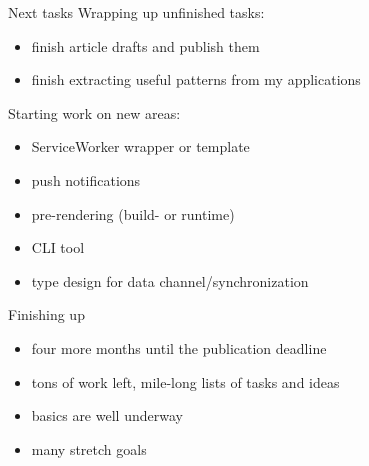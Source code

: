 \documentclass[presentation]{beamer}
\begin{document}
\begin{frame}[label={sec:org31f44b7}]{Next tasks}
Wrapping up unfinished tasks:
\begin{itemize}
\item finish article drafts and publish them
\item finish extracting useful patterns from my applications
\end{itemize}

Starting work on new areas:
\begin{itemize}
\item ServiceWorker wrapper or template
\item push notifications
\item pre-rendering (build- or runtime)
\item CLI tool
\item type design for data channel/synchronization
\end{itemize}
\end{frame}

\begin{frame}[label={sec:orgdcc8229}]{Finishing up}
\begin{itemize}
\item four more months until the publication deadline
\item tons of work left, mile-long lists of tasks and ideas
\item basics are well underway
\item many stretch goals
\end{itemize}
\end{frame}
\end{document}

